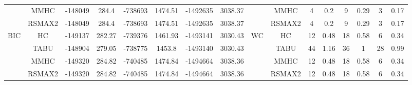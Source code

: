 \begin{table}[h]
{\begin{tabular}{cc||cc|cc|cc||cc|cc|cc|cc}
& MMHC &	-148049 & 	284.4 & 	-738693 & 	1474.51 & 	-1492635 & 	3038.37 & 	& MMHC &	4 & 	0.2 & 	9 & 	0.29 & 	3 & 	0.17\tabularnewline													
& RSMAX2 &	-148049 & 	284.4 & 	-738693 & 	1474.51 & 	-1492635 & 	3038.37 & 	& RSMAX2 &	4 & 	0.2 & 	9 & 	0.29 & 	3 & 	0.17\tabularnewline													
\hline																										
\multirow{4}{*}{BIC} & HC &	-149137 & 	282.27 & 	-739376 & 	1461.93 & 	-1493141 & 	3030.43 & 	\multirow{4}{*}{WC} & HC &	12 & 	0.48 & 	18 & 	0.58 & 	6 & 	0.34\tabularnewline													
& TABU &	-148904 & 	279.05 & 	-738775 & 	1453.8 & 	-1493140 & 	3030.43 & 	& TABU &	44 & 	1.16 & 	36 & 	1 & 	28 & 	0.99\tabularnewline													
& MMHC &	-149320 & 	284.82 & 	-740485 & 	1474.84 & 	-1494664 & 	3038.36 & 	& MMHC &	12 & 	0.48 & 	18 & 	0.58 & 	6 & 	0.34\tabularnewline													
& RSMAX2 &	-149320 & 	284.82 & 	-740485 & 	1474.84 & 	-1494664 & 	3038.36 & 	& RSMAX2 &	12 & 	0.48 & 	18 & 	0.58 & 	6 & 	0.34\tabularnewline													
\hline																										
\end{tabular}																										
}																										
\end{table}																										



